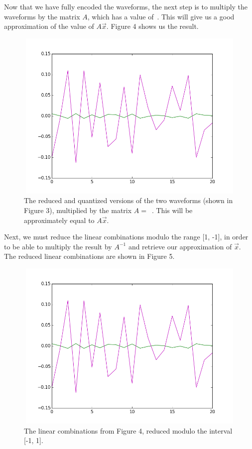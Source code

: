 \documentclass{amsart}
\begin{document}
Now that we have fully encoded the waveforms, the next step is to multiply the waveforms by the matrix $A$, which has a value of~\usebox{\intmat}. This will give us a good approximation of the value of $A\vec{x}$. Figure 4 shows us the result. \\

\begin{figure}
\begin{center}
\includegraphics[height=3.25in,width=5in,angle=0]{lincombs.png} 
\caption{The reduced and quantized versions of the two waveforms (shown in Figure 3), multiplied by the matrix $A =$~\usebox{\intmat}. This will be approximately equal to $A\vec{x}$.}
\end{center}
\end{figure}

Next, we must reduce the linear combinations modulo the range [1, -1], in order to be able to multiply the result by $A^{-1}$ and retrieve our approximation of $\vec{x}$. The reduced linear combinations are shown in Figure 5. \\

\begin{figure}
\begin{center}
\includegraphics[height=3.25in,width=5in,angle=0]{lincombsreduced.png}
\caption{The linear combinations from Figure 4, reduced modulo the interval [-1, 1].}
\end{center}
\end{figure}
\end{document}
